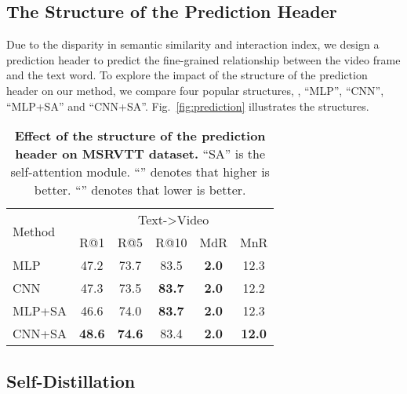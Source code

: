 \documentclass[10pt,twocolumn,letterpaper]{article}
\newcommand{\tabfootnotesize}{\fontsize{8}{9}\selectfont}
\begin{document}
{\subsection{The Structure of the Prediction Header}
Due to the disparity in semantic similarity and interaction index, we design a prediction header to predict the fine-grained relationship  between the  video frame and the  text word. To explore the impact of the structure of the prediction header on our method, we compare four popular structures, \ie, ``MLP'', ``CNN'', ``MLP+SA'' and ``CNN+SA''. Fig.~\ref{fig:prediction} illustrates the structures.

\begin{table}[tb]
\centering
\tabfootnotesize
\setlength{\tabcolsep}{5.2pt}
\begin{tabular}{lccccc}
\toprule[1.25pt]
\multirow{2}{*}{Method} &  \multicolumn{5}{c}{{Text-\textgreater{}Video}}  \\
\cline{2-6}
  & R@1 & R@5 & R@10 & MdR & MnR \\ \midrule
MLP  & 47.2 & 73.7 & 83.5 & \textbf{2.0} & 12.3\\
CNN  & 47.3 & 73.5 & \textbf{83.7} & \textbf{2.0} & 12.2\\
\midrule
MLP+SA  & 46.6 & 74.0 & \textbf{83.7} & \textbf{2.0} & 12.3\\
\rowcolor{aliceblue!60} CNN+SA   & \textbf{48.6} & \textbf{74.6} & 83.4 & \textbf{2.0} & \textbf{12.0} \\ \bottomrule[1.25pt]
\end{tabular}
\caption{\textbf{Effect of the structure of the prediction header on MSRVTT dataset.} ``SA'' is the self-attention module. ``'' denotes that higher is better. ``'' denotes that lower is better.}
\label{tab:prediction head}
\end{table}

\subsection{Self-Distillation}

}
\end{document}
